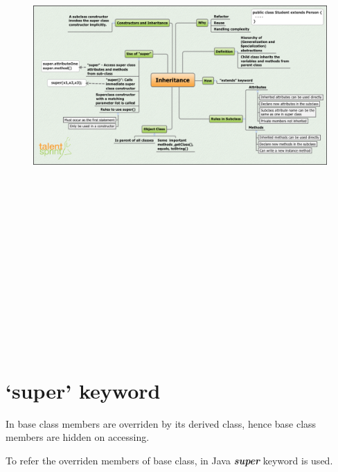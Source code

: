 \documentclass[11pt,a4paper]{article}
\begin{document}
  \begin{figure}[H]
 \begin{center}
   \includegraphics[angle=90,height=20cm, width=13cm]{Inheritance-MM.png}
  
 \end{center}
 \end{figure}
 
 \section*{`super' keyword}
In base class members are overriden by its derived class, hence base class members are hidden on accessing.

To refer the overriden members of base class, in Java \emph{\textbf{super}} keyword is used.
 
\end{document}
